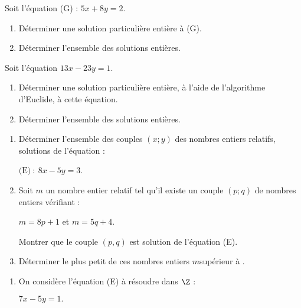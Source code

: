 \begin{colonne*exercice}
\begin{exercice}
Soit l’équation (G) : $5x + 8y = 2$.
\begin{enumerate}
\item Déterminer une solution particulière entière à (G).
\item Déterminer l’ensemble des solutions entières.
\end{enumerate}
\end{exercice}

\begin{exercice}
Soit l'équation $13x - 23y = 1$.
\begin{enumerate}
\item Déterminer une solution particulière entière, à l'aide de
  l'algorithme d’Euclide, à cette équation.
\item Déterminer l'ensemble des solutions entières.
\end{enumerate}
\end{exercice}

\begin{exercice}
\begin{enumerate}
\item Déterminer l’ensemble des couples $(x; y)$ des nombres entiers
  relatifs, solutions de l'équation :

{\centering $\text{(E)}~:~8x - 5y = 3$.\par}

\item Soit $m$ un nombre entier relatif tel qu'il existe un couple
  $(p; q)$ de nombres entiers vérifiant :

$m=8p + 1$ et $m = 5q + 4$.

Montrer que le couple $(p, q)$ est solution de l’équation (E).

\item Déterminer le plus petit de ces nombres entiers $m$\linebreak supérieur à
  .
\end{enumerate}
\end{exercice}

\begin{exercice}
\begin{enumerate}
\item On considère l'équation (E) à résoudre dans $\Z$ :

{\centering $7x - 5y = 1.$\par}


\end{enumerate}
\end{exercice}
\end{colonne*exercice}
